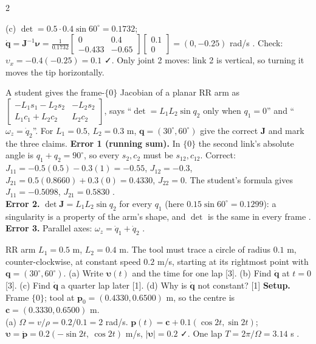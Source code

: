 \begin{multicols}{2}
\begin{examq}
(c) $\det=0.5\cdot0.4\sin60^\circ=0.1732$; $\dot{\mathbf q}=\mathbf J^{-1}\boldsymbol\nu=\frac1{0.1732}\begin{bmatrix}0&0.4\\-0.433&-0.65\end{bmatrix}\begin{bmatrix}0.1\\0\end{bmatrix}=(0,-0.25)$ rad/s . Check: $\upsilon_x=-0.4(-0.25)=0.1$ ✓. Only joint 2 moves: link 2 is vertical, so turning it moves the tip horizontally. \chk
\end{examq}
\begin{examq}
A student gives the frame-$\{0\}$ Jacobian of a planar RR arm as $\begin{bmatrix}-L_1s_1-L_2s_2&-L_2s_2\\L_1c_1+L_2c_2&L_2c_2\end{bmatrix}$, says ``$\det=L_1L_2\sin q_2$ only when $q_1=0$'' and ``$\omega_z=\dot q_2$''. For $L_1=0.5$, $L_2=0.3$ m, $\mathbf q=(30^\circ,60^\circ)$ give the correct $\mathbf J$ and mark the three claims.
\solution
\textbf{Error 1 (running sum).} In $\{0\}$ the second link's absolute angle is $q_1+q_2=90^\circ$, so every $s_2,c_2$ must be $s_{12},c_{12}$. Correct: $J_{11}=-0.5(0.5)-0.3(1)=-0.55$, $J_{12}=-0.3$, $J_{21}=0.5(0.8660)+0.3(0)=0.4330$, $J_{22}=0$. The student's formula gives $J_{11}=-0.5098$, $J_{21}=0.5830$ .\\
\textbf{Error 2.} $\det\mathbf J=L_1L_2\sin q_2$ for every $q_1$ (here $0.15\sin60^\circ=0.1299$): a singularity is a property of the arm's shape, and $\det$ is the same in every frame .\\
\textbf{Error 3.} Parallel axes: $\omega_z=\dot q_1+\dot q_2$ . \chk
\end{examq}
\begin{examq}
RR arm $L_1=0.5$ m, $L_2=0.4$ m. The tool must trace a circle of radius $0.1$ m, counter-clockwise, at constant speed $0.2$ m/s, starting at its rightmost point with $\mathbf q=(30^\circ,60^\circ)$. (a) Write $\boldsymbol\upsilon(t)$ and the time for one lap [3]. (b) Find $\dot{\mathbf q}$ at $t=0$ [3]. (c) Find $\dot{\mathbf q}$ a quarter lap later [1]. (d) Why is $\dot{\mathbf q}$ not constant? [1]
\solution
\textbf{Setup.} Frame $\{0\}$; tool at $\mathbf p_0=(0.4330,0.6500)$ m, so the centre is $\mathbf c=(0.3330,0.6500)$ m.\\
(a) $\Omega=v/\rho=0.2/0.1=2$ rad/s. $\mathbf p(t)=\mathbf c+0.1(\cos2t,\sin2t)$; $\boldsymbol\upsilon=\dot{\mathbf p}=0.2(-\sin2t,\ \cos2t)$ m/s, $|\boldsymbol\upsilon|=0.2$ ✓. One lap $T=2\pi/\Omega=3.14$ s .\\

\end{examq}
\end{multicols}
